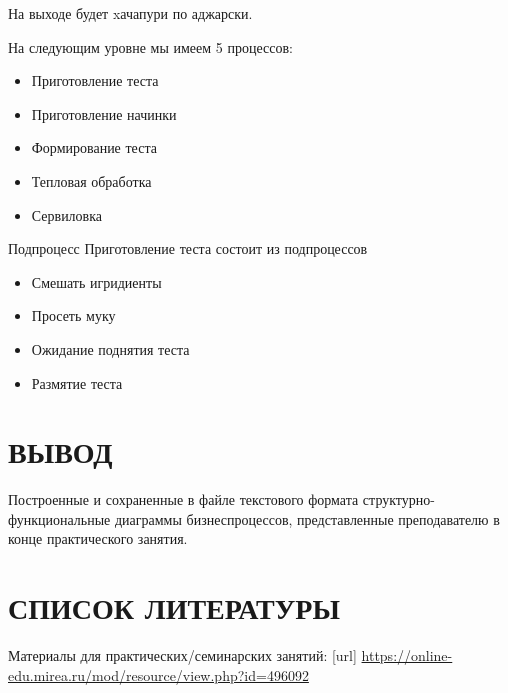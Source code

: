 На выходе будет xачапури по аджарски.


\newpage

На следующим уровне мы имеем 5 процессов:
\begin{itemize}
	\item Приготовление теста
	\item Приготовление начинки
	\item Формирование теста
	\item Тепловая обработка
	\item Сервиловка
\end{itemize}


\newpage

Подпроцесс Приготовление теста состоит из подпроцессов
\begin{itemize}
	\item Смешать игридиенты
	\item Просеть муку
	\item Ожидание поднятия теста
	\item Размятие теста
\end{itemize}




\newpage

\section*{ВЫВОД}
Построенные и сохраненные в
файле текстового формата структурно-функциональные диаграммы бизнеспроцессов,
представленные преподавателю в конце практического занятия.

\section*{СПИСОК ЛИТЕРАТУРЫ}
\begin{thebibliography}{}
	\bibitem{}  Материалы для практических/семинарских занятий: [url]
	\url{https://online-edu.mirea.ru/mod/resource/view.php?id=496092}
\end{thebibliography}
